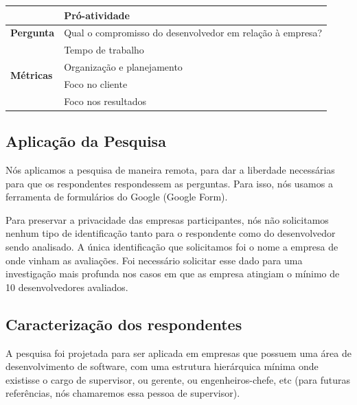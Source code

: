 \begin{table}[h]
\begin{tabular}{|p{2cm}|p{6.25cm}|p{6.25cm}|}
		& \multicolumn{2}{l|}{Pró-atividade}                                                                      \\ \hline\hline
		\textbf{Pergunta}                  & \multicolumn{2}{l|}{\parbox{12cm}{Qual o compromisso do desenvolvedor em relação à empresa?}}                          \\ \hline
		\multirow{4}{*}{\textbf{Métricas}} & \multicolumn{2}{l|}{Tempo de trabalho}                                                                  \\ \cline{2-3} 
		& \multicolumn{2}{l|}{Organização e planejamento}                                                         \\ \cline{2-3} 
		& \multicolumn{2}{l|}{Foco no cliente}                                                                    \\ \cline{2-3} 
		& \multicolumn{2}{l|}{Foco nos resultados}                                                                \\ \hline
	\end{tabular}
\end{table}

\subsection{Aplicação da Pesquisa}

Nós aplicamos a pesquisa de maneira remota, para dar a liberdade necessárias para que os respondentes respondessem as perguntas. Para isso, nós usamos a ferramenta de formulários do Google (Google Form).

Para preservar a privacidade das empresas participantes, nós não solicitamos nenhum tipo de identificação tanto para o respondente como do desenvolvedor sendo analisado. A única identificação que solicitamos foi o nome a empresa de onde vinham as avaliações. Foi necessário solicitar esse dado para uma investigação mais profunda nos casos em que as empresa atingiam o mínimo de 10 desenvolvedores avaliados.

\subsection{Caracterização dos respondentes}

A pesquisa foi projetada para ser aplicada em empresas que possuem uma área de desenvolvimento de software, com uma estrutura hierárquica mínima onde existisse o cargo de supervisor, ou gerente, ou engenheiros-chefe, etc (para futuras referências, nós chamaremos essa pessoa de supervisor).

